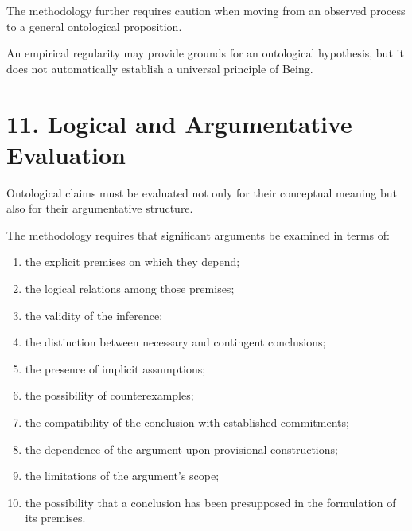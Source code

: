 The methodology further requires
caution when moving from an
observed process to a general
ontological proposition.

An empirical regularity may
provide grounds for an ontological
hypothesis, but it does not
automatically establish a universal
principle of Being.


\section*{11. Logical and Argumentative Evaluation}

Ontological claims must be evaluated
not only for their conceptual
meaning but also for their
argumentative structure.

The methodology requires that
significant arguments be examined
in terms of:

\begin{enumerate}

    \item the explicit premises
    on which they depend;

    \item the logical relations
    among those premises;

    \item the validity of the
    inference;

    \item the distinction between
    necessary and contingent
    conclusions;

    \item the presence of implicit
    assumptions;

    \item the possibility of
    counterexamples;

    \item the compatibility of
    the conclusion with established
    commitments;

    \item the dependence of the
    argument upon provisional
    constructions;

    \item the limitations of
    the argument's scope;

    \item the possibility that
    a conclusion has been
    presupposed in the formulation
    of its premises.

\end{enumerate}

